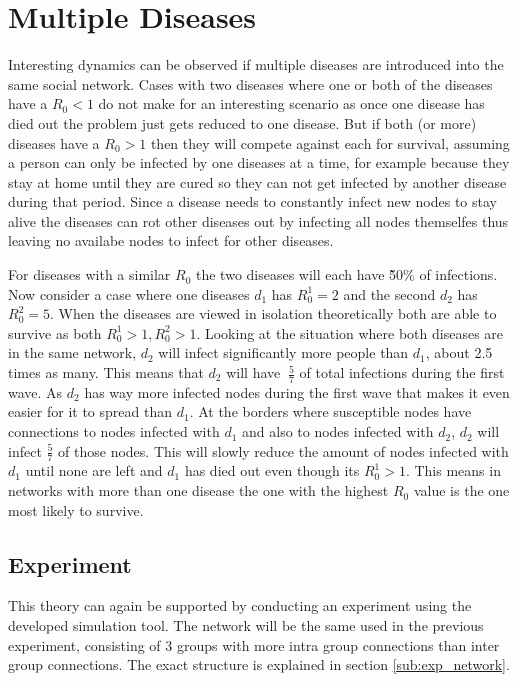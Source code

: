 \section{Multiple Diseases}
Interesting dynamics can be observed if multiple diseases are introduced into the same
social network. Cases with two diseases where one or both of the diseases have a $R_0 < 1$
do not make for an interesting scenario as once one disease has died out the problem just
gets reduced to one disease. But if both (or more) diseases have a $R_0 > 1$ then they 
will compete against each for survival, assuming a person can only be infected by one diseases
at a time, for example because they stay at home until they are cured so they can not get
infected by another disease during that period. Since a disease needs to constantly infect
new nodes to stay alive the diseases can rot other diseases out by infecting all nodes themselfes
thus leaving no availabe nodes to infect for other diseases.

For diseases with a similar $R_0$ the two diseases will each have \~50\% of infections.
Now consider a case where one diseases $d_1$ has $R_0^1=2$ and the second $d_2$ has $R_0^2=5$.
When the diseases are viewed in isolation theoretically both are able to survive as both
$R_0^1 > 1, R_0^2>1$. Looking at the situation where both diseases are in the same network,
$d_2$ will infect significantly more people than $d_1$, about 2.5 times as many. This means
that $d_2$ will have $~\frac{5}{7}$ of total infections during the first wave. As $d_2$ has
way more infected nodes during the first wave that makes it even easier for it to spread than
$d_1$. At the borders where susceptible nodes have connections to nodes infected with $d_1$
and also to nodes infected with $d_2$, $d_2$ will infect $\frac{5}{7}$ of those nodes. This
will slowly reduce the amount of nodes infected with $d_1$ until none are left and $d_1$ has died
out even though its $R_0^1>1$. This means in networks with more than one disease the one 
with the highest $R_0$ value is the one most likely to survive.

\subsection{Experiment}
This theory can again be supported by conducting an experiment using the developed simulation
tool. The network will be the same used in the previous experiment, consisting of 3 groups with
more intra group connections than inter group connections. The exact structure is explained
in section \ref{sub:exp_network}.

